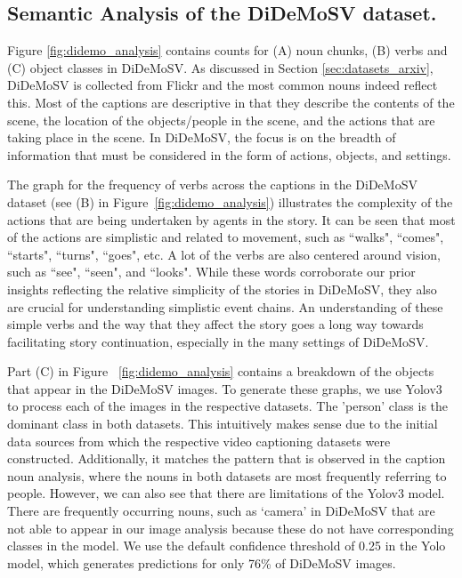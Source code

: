 \documentclass[runningheads]{llncs}
\begin{document}
\subsection{Semantic Analysis of the DiDeMoSV dataset.}
Figure \ref{fig:didemo_analysis} contains counts for (A) noun chunks, (B) verbs and (C) object classes in DiDeMoSV. As discussed in Section \ref{sec:datasets_arxiv}, DiDeMoSV is collected from Flickr and the most common nouns indeed reflect this. Most of the captions are descriptive in that they describe the contents of the scene, the location of the objects/people in the scene, and the actions that are taking place in the scene. In DiDeMoSV, the focus is on the breadth of information that must be considered in the form of actions, objects, and settings.


The graph for the frequency of verbs across the captions in the DiDeMoSV dataset (see (B) in Figure~\ref{fig:didemo_analysis}) illustrates the complexity of the actions that are being undertaken by agents in the story. It can be seen that most of the actions are simplistic and related to movement, such as ``walks", ``comes", ``starts", ``turns", ``goes", etc. A lot of the verbs are also centered around vision, such as ``see", ``seen", and ``looks". While these words corroborate our prior insights reflecting the relative simplicity of the stories in DiDeMoSV, they also are crucial for understanding simplistic event chains. An understanding of these simple verbs and the way that they affect the story goes a long way towards facilitating story continuation, especially in the many settings of DiDeMoSV.

Part (C) in Figure ~\ref{fig:didemo_analysis} contains a breakdown of the objects that appear in the DiDeMoSV images. To generate these graphs, we use Yolov3 \cite{yolov3} to process each of the images in the respective datasets. The 'person' class is the dominant class in both datasets. This intuitively makes sense due to the initial data sources from which the respective video captioning datasets were constructed. Additionally, it matches the pattern that is observed in the caption noun analysis, where the nouns in both datasets are most frequently referring to people. However, we can also see that there are limitations of the Yolov3 model. There are frequently occurring nouns, such as `camera' in DiDeMoSV that are not able to appear in our image analysis because these do not have corresponding classes in the model. We use the default confidence threshold of 0.25 in the Yolo model, which generates predictions for only 76\% of DiDeMoSV images.
\end{document}
